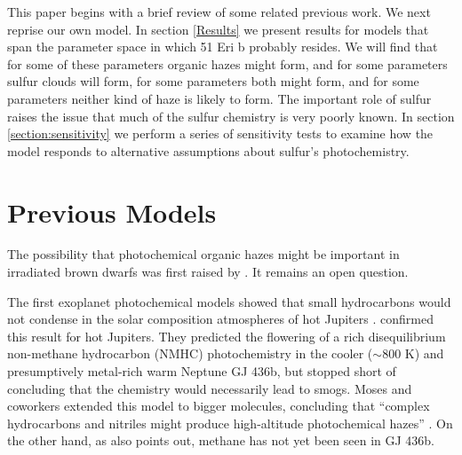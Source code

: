 \documentclass[preprint]{aastex}
\begin{document}
This paper begins with a brief review of some related previous work.
We next reprise our own model.
In section \ref{Results} we present results for models that span
 the parameter space in which 51 Eri b probably resides.
 We will find that for some of these parameters organic hazes might form, and for some parameters sulfur clouds will form,
 for some parameters both might form, and for some parameters neither kind of haze is likely to form.
 The important role of sulfur raises the issue that much of the sulfur chemistry is very poorly known.
 In section \ref{section:sensitivity} we perform a series of sensitivity tests to examine how the model responds to alternative
 assumptions about sulfur's photochemistry.

\section{Previous Models}

The possibility that photochemical organic hazes might be important in irradiated brown dwarfs was first raised by \citet{Griffith1998}.
It remains an open question.

The first exoplanet photochemical models showed that small hydrocarbons would not condense 
in the solar composition atmospheres of hot Jupiters \citep{Liang2003,Liang2004}.
\citet{Line2010,Line2011} confirmed this result for hot Jupiters. 
They predicted the flowering of a rich disequilibrium non-methane hydrocarbon (NMHC) photochemistry
in the cooler ($\sim 800$ K) and presumptively metal-rich warm Neptune GJ 436b,
but stopped short of concluding that the chemistry would necessarily lead to smogs. 
Moses and coworkers \citep{Moses2011,Visscher2011,Moses2013a,Moses2013b,Moses2014} 
extended this model to bigger molecules, concluding   
that  ``complex hydrocarbons and nitriles might produce high-altitude photochemical hazes'' \citep{Moses2014}.
 On the other hand, as \citet{Moses2014} also points out, methane has not yet been seen in GJ 436b.
\end{document}
